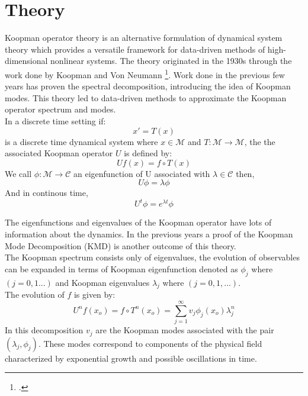 \documentclass{article}
\begin{document}
\section*{Theory}
Koopman operator theory is an alternative formulation of dynamical system theory which provides a versatile framework for data-driven methods of high-dimensional nonlinear systems. The theory originated in the 1930s through the work done by Koopman and Von Neumann \footcite{koopman1931hamiltonian}. Work done in the previous few years has proven the spectral decomposition, introducing the idea of Koopman modes. This theory led to data-driven methods to approximate the Koopman operator spectrum and modes.\\

In a discrete time setting if:
\begin{equation}
x' = T(x)
\end{equation}
is a discrete time dynamical system where $x\in \mathcal{M}$ and $T: \mathcal{M} \to \mathcal{M}$, the the associated Koopman operator $U$ is defined by:
\begin{equation}
Uf(x)=f\circ T(x)
\end{equation}
We call $\phi: \mathcal{M}\to \mathcal{C}$ an eigenfunction of U associated with $\lambda \in \mathcal{C}$ then,
\begin{equation}
U\phi =\lambda \phi
\end{equation}
And in continous time,
\begin{equation}
U^t\phi = e^{\lambda t}\phi
\end{equation}

The eigenfunctions and eigenvalues of the Koopman operator have lots of information about the dynamics. In the previous years a proof of the Koopman Mode Decomposition (KMD) is another outcome of this theory.\\

The Koopman spectrum consists only of eigenvalues, the evolution of observables can be expanded in terms of Koopman eigenfunction denoted as $\phi_j$ where $(j=0,1...)$ and Koopman eigenvalues $\lambda_j$ where $(j=0,1,...)$.\\
The evolution of $f$ is given by:
\begin{equation}
U^nf(x_o) = f \circ T^n(x_o) = \sum_{j=1}^{\infty} v_j\phi_j(x_o)\lambda_{j}^{n} 
\end{equation}
In this decomposition $v_j$ are the Koopman modes associated with the pair $(\lambda_j,\phi_j)$. These modes correspond to components of the physical field characterized by exponential growth and possible oscillations in time.\\
\end{document}
